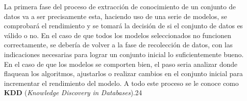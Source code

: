\linebreak
La primera fase del proceso de extracción de conocimiento de un conjunto de datos va a ser precisamente esta, haciendo uso de una serie de modelos, se comprobará el rendimiento y se tomará la decisión de si el conjunto de datos es válido o no. En el caso de que todos los modelos seleccionados no funcionen correctamente, se debería de volver a la fase de recolección de datos, con las indicaciones necesarias para lograr un conjunto inicial lo suficientemente bueno. \\
\linebreak
En el caso de que los modelos se comporten bien, el paso seria analizar donde flaquean los algoritmos,  ajustarlos o realizar cambios en el conjunto inicial para incrementar el rendimiento del modelo. A todo este proceso se le conoce como \textbf{KDD} (\textit{Knowledge Discovery in Databases}).24
